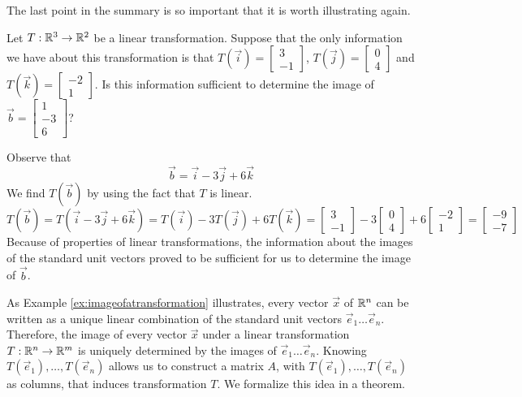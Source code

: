 \documentclass{ximera}
\begin{document}
The last point in the summary is so important that it is worth illustrating again.

\begin{example}\label{ex:imageofatransformation}  
Let $T:\mathbb{R}^3\rightarrow \mathbb{R}^2$ be a linear transformation. Suppose that the only information we have about this transformation is that $T(\vec{i})=\begin{bmatrix}3\\-1\end{bmatrix}$, $T(\vec{j})=\begin{bmatrix}0\\4\end{bmatrix}$ and $T(\vec{k})=\begin{bmatrix}-2\\1\end{bmatrix}$.  Is this information sufficient to determine the image of $\vec{b}=\begin{bmatrix}1\\-3\\6\end{bmatrix}$?

\begin{explanation}  Observe that 
$$\vec{b}=\vec{i}-3\vec{j}+6\vec{k}$$
We find $T(\vec{b})$ by using the fact that $T$ is linear.
$$T(\vec{b})=T(\vec{i}-3\vec{j}+6\vec{k})=T(\vec{i})-3T(\vec{j})+6T(\vec{k})=\begin{bmatrix}3\\-1\end{bmatrix}-3\begin{bmatrix}0\\4\end{bmatrix}+6\begin{bmatrix}-2\\1\end{bmatrix}=\begin{bmatrix}-9\\-7\end{bmatrix}$$
Because of properties of linear transformations, the information about the images of the standard unit vectors proved to be sufficient for us to determine the image of $\vec{b}$. 
\end{explanation}
\end{example}

As Example \ref{ex:imageofatransformation} illustrates, every vector $\vec{x}$ of $\mathbb{R}^n$ can be written as a unique linear combination of the standard unit vectors $\vec{e}_1\ldots \vec{e}_n$.  Therefore, the image of every vector $\vec{x}$ under a linear transformation $T:\mathbb{R}^n\rightarrow \mathbb{R}^m$ is uniquely determined by the images of $\vec{e}_1\ldots \vec{e}_n$.  Knowing $T(\vec{e}_1),\ldots , T(\vec{e}_n)$ allows us to construct a matrix $A$, with $T(\vec{e}_1),\ldots , T(\vec{e}_n)$ as columns, that induces transformation $T$.  We formalize this idea in a theorem.
\end{document}
